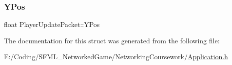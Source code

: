 \hypertarget{struct_player_update_packet_ab585017bc89d8c48dcbc3ad46c2986e9}{}\label{struct_player_update_packet_ab585017bc89d8c48dcbc3ad46c2986e9} 
\subsubsection{\texorpdfstring{Y\+Pos}{YPos}}
{\footnotesize\ttfamily float Player\+Update\+Packet\+::\+Y\+Pos}



The documentation for this struct was generated from the following file\+:\begin{DoxyCompactItemize}
\item 
E\+:/\+Coding/\+S\+F\+M\+L\+\_\+\+Networked\+Game/\+Networking\+Coursework/\hyperlink{_application_8h}{Application.\+h}\end{DoxyCompactItemize}
